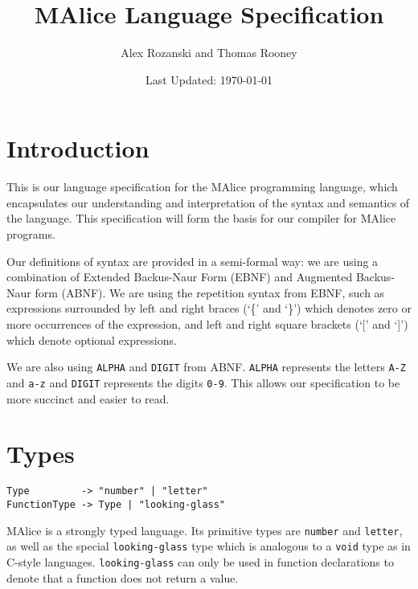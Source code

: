 \documentclass[a4wide, 11pt]{article}
\begin{document}
\title{MAlice Language Specification}

\author{Alex Rozanski and Thomas Rooney}

\date{Last Updated: \today}         %

\maketitle            %

\section{Introduction}

This is our language specification for the MAlice programming language, which encapsulates our understanding and interpretation of the syntax and semantics of the language. This specification will form the basis for our compiler for MAlice programs.

Our definitions of syntax are provided in a semi-formal way: we are using a combination of Extended Backus-Naur Form (EBNF) and Augmented Backus-Naur form (ABNF). We are using the repetition syntax from EBNF, such as expressions surrounded by left and right braces (`\{' and `\}') which denotes zero or more occurrences of the expression, and left and right square brackets (`[' and `]') which denote optional expressions.

We are also using \texttt{ALPHA} and \texttt{DIGIT} from ABNF. \texttt{ALPHA} represents the letters \texttt{A-Z} and \texttt{a-z} and \texttt{DIGIT} represents the digits \texttt{0-9}. This allows our specification to be more succinct and easier to read.

\section{Types}

\begin{verbatim}
Type         -> "number" | "letter"
FunctionType -> Type | "looking-glass"
\end{verbatim}

MAlice is a strongly typed language. Its primitive types are \texttt{number} and \texttt{letter}, as well as the special \texttt{looking-glass} type which is analogous to a \texttt{void} type as in C-style languages. \texttt{looking-glass} can only be used in function declarations to denote that a function does not return a value.
\end{document}
